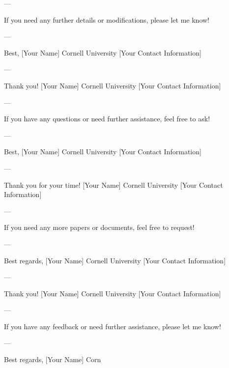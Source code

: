 --- 

If you need any further details or modifications, please let me know! 

--- 

Best,  
[Your Name]  
Cornell University  
[Your Contact Information]  

--- 

Thank you!  
[Your Name]  
Cornell University  
[Your Contact Information]  

--- 

If you have any questions or need further assistance, feel free to ask! 

--- 

Best,  
[Your Name]  
Cornell University  
[Your Contact Information]  

--- 

Thank you for your time!  
[Your Name]  
Cornell University  
[Your Contact Information]  

--- 

If you need any more papers or documents, feel free to request! 

--- 

Best regards,  
[Your Name]  
Cornell University  
[Your Contact Information]  

--- 

Thank you!  
[Your Name]  
Cornell University  
[Your Contact Information]  

--- 

If you have any feedback or need further assistance, please let me know! 

--- 

Best regards,  
[Your Name]  
Corn
